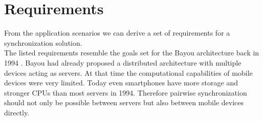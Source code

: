 \section{Requirements}
\label{sec:requirements}
From the application scenarios we can derive a set of requirements for a synchronization solution.\\
The listed requirements resemble the goals set for the Bayou architecture back in 1994 \cite{Demers:1994vj}. 
Bayou had already proposed a distributed architecture with multiple devices acting as servers.
At that time the computational capabilities of mobile devices were very limited.
Today even smartphones have more storage and stronger CPUs than most servers in 1994.
Therefore pairwise synchronization should not only be possible between servers but also between mobile devices directly.

